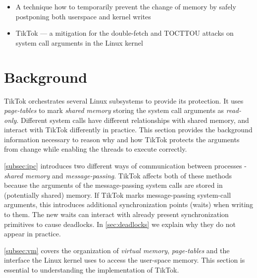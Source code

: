 \documentclass[conference]{IEEEtran}
\newcommand{\sysname}{TikTok}
\begin{document}
\begin{itemize}
\item A technique how to temporarily prevent the change of memory by safely
      postponing both userspace and kernel writes
\item \sysname{} --- a mitigation for the double-fetch and TOCTTOU attacks on system
      call arguments in the Linux kernel
\end{itemize}

\section{Background}
\label{sec:background}

\sysname{} orchestrates several Linux subsystems to provide its protection. It uses
\emph{page-tables} to mark \emph{shared memory} storing the system call
arguments as \emph{read-only}. Different system calls have different
relationships with shared memory, and interact with \sysname{} differently in
practice. This section provides the background information necessary to reason
why and how \sysname{} protects the arguments from change while enabling the threads to
execute correctly.

\autoref{subsec:ipc} introduces two different ways of communication between
processes - \emph{shared memory} and \emph{message-passing}. \sysname{} affects
both of these methods because the arguments of the message-passing system calls
are stored in (potentially shared) memory. If \sysname{} marks message-passing
system-call arguments, this introduces additional synchronization points (waits)
when writing to them. The new waits can interact with already present
synchronization primitives to cause deadlocks. In \autoref{sec:deadlocks} we
explain why they do not appear in practice.

\autoref{subsec:vm} covers the organization of \emph{virtual memory},
\emph{page-tables} and the interface the Linux kernel uses to access the
user-space memory. This section is essential to understanding the implementation
of \sysname.
\end{document}
